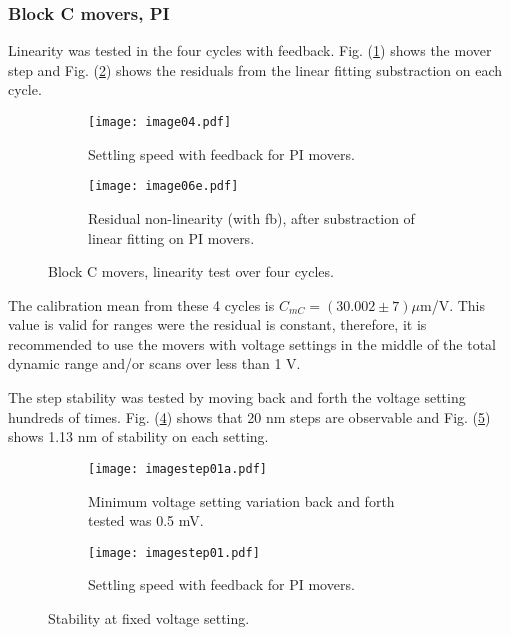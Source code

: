 \subsubsection{Block C movers, PI}
Linearity was tested in the four cycles with feedback. Fig. (\ref{f:PImsteps}) shows the mover step and Fig. (\ref{f:PIlinres}) shows the residuals from the linear fitting substraction on each cycle.\par
\begin{figure}[!htb]
 \centering\hspace*{-0.6cm}
\begin{subfigure}{0.4\textwidth}
 \texttt{[image: image04.pdf]}\caption{Settling speed with feedback for PI movers.}\label{f:PImsteps}
\end{subfigure}\hspace*{1.5cm}
\begin{subfigure}{0.4\textwidth}
 \texttt{[image: image06e.pdf]}\caption{Residual non-linearity (with fb), after substraction of linear fitting on PI movers.}\label{f:PIlinres}
\end{subfigure}\caption{Block C movers, linearity test over four cycles.}\label{f:PIfeedback}
\end{figure}
The calibration mean from these 4 cycles is $C_{mC} = (30.002\pm7)\mu$m/V. This value is valid for ranges were the residual is constant, therefore, it is recommended to use the movers with voltage settings in the middle of the total dynamic range and/or scans over less than 1 V.\par
The step stability was tested by moving back and forth the voltage setting hundreds of times. Fig. (\ref{f:PIstepstab}) shows that 20 nm steps are observable and Fig. (\ref{f:PIstab}) shows 1.13 nm of stability on each setting.\par
\begin{figure}[!htb]
 \centering\hspace*{-0.6cm}
\begin{subfigure}{0.4\textwidth}
\texttt{[image: imagestep01a.pdf]}\caption{Minimum voltage setting variation back and forth tested was 0.5 mV.}\label{f:PIstepstab}
\end{subfigure}\hspace*{1.5cm}
\begin{subfigure}{0.4\textwidth}
 \texttt{[image: imagestep01.pdf]}\caption{Settling speed with feedback for PI movers.}\label{f:PIstab}
\end{subfigure}\caption{Stability at fixed voltage setting.}\label{f:PIstability}
\end{figure}
